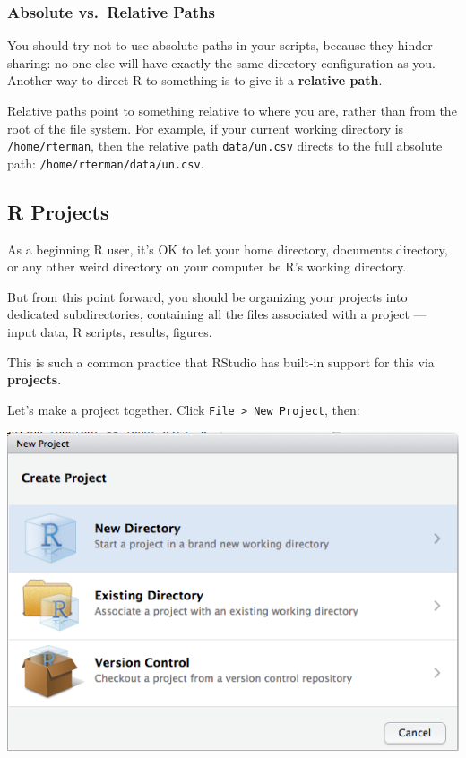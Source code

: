 \documentclass[]{book}
\begin{document}
\subsubsection*{Absolute vs.~Relative
Paths}\label{absolute-vs.relative-paths}

You should try not to use absolute paths in your scripts, because they
hinder sharing: no one else will have exactly the same directory
configuration as you. Another way to direct R to something is to give it
a \textbf{relative path}.

Relative paths point to something relative to where you are, rather than
from the root of the file system. For example, if your current working
directory is \texttt{/home/rterman}, then the relative path
\texttt{data/un.csv} directs to the full absolute path:
\texttt{/home/rterman/data/un.csv}.

\subsection{R Projects}\label{r-projects}

As a beginning R user, it's OK to let your home directory, documents
directory, or any other weird directory on your computer be R's working
directory.

But from this point forward, you should be organizing your projects into
dedicated subdirectories, containing all the files associated with a
project --- input data, R scripts, results, figures.

This is such a common practice that RStudio has built-in support for
this via \textbf{projects}.

Let's make a project together. Click
\texttt{File\ \textgreater{}\ New\ Project}, then:

\begin{center}\includegraphics[width=0.7\linewidth]{img/rstudio-project-1} \end{center}
\end{document}
